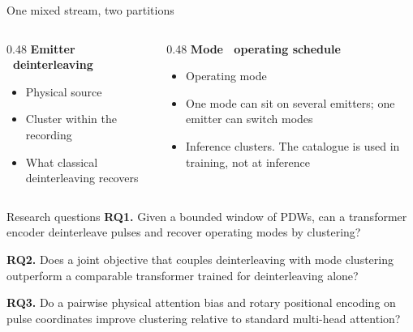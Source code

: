 \documentclass[aspectratio=169,10pt]{beamer}
\newcommand{\thesisfig}[3]{%
  \resizebox{#1}{#2}{}%
}
\begin{document}
\begin{frame}{One mixed stream, two partitions}
  \centering
  \thesisfig{0.86\textwidth}{!}{../figures/method/partitions.tex}

  \vspace{0.15em}
  \begin{columns}[T]
    \begin{column}{0.48\textwidth}
      \textbf{Emitter \textperiodcentered\ deinterleaving}
      \begin{itemize}
        \item Physical source
        \item Cluster within the recording
        \item What classical deinterleaving recovers
      \end{itemize}
    \end{column}
    \begin{column}{0.48\textwidth}
      \textbf{Mode \textperiodcentered\ operating schedule}
      \begin{itemize}
        \item Operating mode
        \item One mode can sit on several emitters; one emitter can switch modes
        \item Inference clusters. The catalogue is used in training, not at inference
      \end{itemize}
    \end{column}
  \end{columns}
\end{frame}

\begin{frame}{Research questions}
  \textbf{RQ1.} Given a bounded window of PDWs, can a transformer encoder deinterleave pulses and recover operating modes by clustering?

  \vspace{0.7em}
  \textbf{RQ2.} Does a joint objective that couples deinterleaving with mode clustering outperform a comparable transformer trained for deinterleaving alone?

  \vspace{0.7em}
  \textbf{RQ3.} Do a pairwise physical attention bias and rotary positional encoding on pulse coordinates improve clustering relative to standard multi-head attention?
\end{frame}
\end{document}

